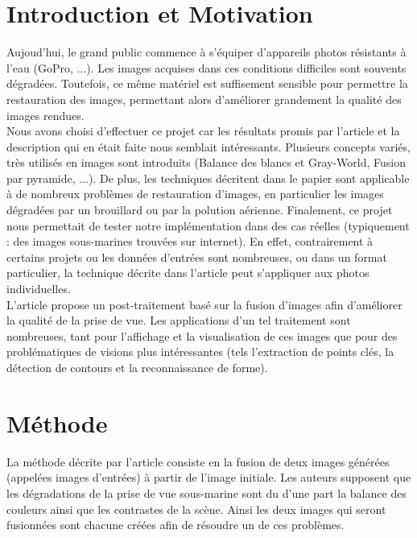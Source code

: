 \documentclass[twoside]{article}
\begin{document}
\section{Introduction et Motivation}
Aujoud'hui, le grand public commence à s'équiper d'appareils photos résistants à l'eau (GoPro, ...). Les images acquises dans ces conditions difficiles sont souvents dégradées. Toutefois, ce même matériel est suffisement sensible pour permettre la restauration des images, permettant alors d'améliorer grandement la qualité des images rendues.\\
Nous avons choisi d'effectuer ce projet car les résultats promis par l'article et la description qui en était faite nous semblait intéressants. Plusieurs concepts variés, très utilisés en images sont introduits (Balance des blancs et Gray-World, Fusion par pyramide, ...). De plus, les techniques décritent dans le papier sont applicable à de nombreux problèmes de restauration d'images, en particulier les images dégradées par un brouillard ou par la polution aérienne. Finalement, ce projet nous permettait de tester notre implémentation dans des cas réelles (typiquement : des images sous-marines trouvées sur internet). En effet, contrairement à certains projets ou les données d'entrées sont nombreuses, ou dans un format particulier, la technique décrite dans l'article peut s'appliquer aux photos individuelles.\\
L’article propose un post-traitement basé sur la fusion d’images afin d’améliorer la qualité de la prise de vue. Les applications d’un tel traitement sont nombreuses, tant pour l’affichage et la visualisation de ces images que pour des problématiques de visions plus intéressantes (tels l’extraction de points clés, la détection de contours et la reconnaissance de forme).\\


\section{Méthode}

La méthode décrite par l’article consiste en la fusion de deux images générées (appelées images d'entrées) à partir de l’image initiale. Les auteurs supposent que les dégradations de la prise de vue sous-marine sont du d’une part la balance des couleurs ainsi que les contrastes de la scène. Ainsi les deux images qui seront fusionnées sont chacune créées afin de résoudre un de ces problèmes.\\
\end{document}
